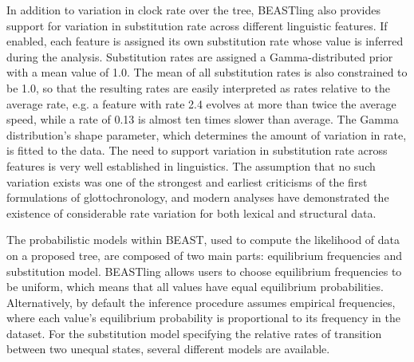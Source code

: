 \documentclass[twocolumn,10pt]{scrartcl}
\begin{document}
In addition to variation in clock rate over the tree, BEASTling also provides support for variation in substitution rate across different linguistic features.  If enabled, each feature is assigned its own substitution rate whose value is inferred during the analysis.  Substitution rates are assigned a Gamma-distributed prior with a mean value of 1.0.  The mean of all substitution rates is also constrained to be 1.0, so that the resulting rates are easily interpreted as rates relative to the average rate, e.g. a feature with rate 2.4 evolves at more than twice the average speed, while a rate of 0.13 is almost ten times slower than average.  The Gamma distribution's shape parameter, which determines the amount of variation in rate, is fitted to the data.  The need to support variation in substitution rate across features is very well established in linguistics.  The assumption that no such variation exists was one of the strongest and earliest criticisms of the first formulations of glottochronology, and modern analyses have demonstrated the existence of considerable rate variation for both lexical\cite{Pagel2007} and structural\cite{Greenhill2010,Dediu2011} data.

The probabilistic models within BEAST, used to compute the likelihood of data on a proposed tree, are composed of two main parts: equilibrium frequencies and substitution model.  BEASTling allows users to choose equilibrium frequencies to be uniform, which means that all values have equal equilibrium probabilities. Alternatively, by default the inference procedure assumes empirical frequencies, where each value's equilibrium probability is proportional to its frequency in the dataset.  For the substitution model specifying the relative rates of transition between two unequal states, several different models are available.
\end{document}
